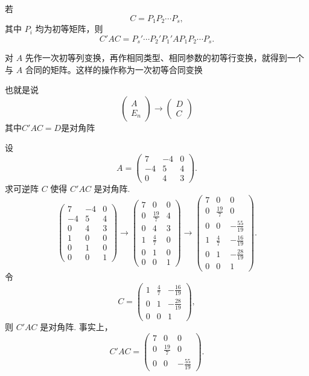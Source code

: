 若
\[
C=P_1P_2\cdots P_s,
\]
其中 $P_i$ 均为初等矩阵，则
\[
C'AC=P_s'\cdots P_2'P_1'AP_1P_2\cdots P_s.
\]
\begin{definition}\label{p1:concept:c7-l795}
	对 $A$ 先作一次初等列变换，再作相同类型、相同参数的初等行变换，就得到一个与 $A$ 合同的矩阵。这样的操作称为一次初等合同变换
\end{definition}
也就是说\[\begin{pmatrix}
	A\\
	E_n
\end{pmatrix}\to \begin{pmatrix}
D\\
C
\end{pmatrix}\]
其中$C'AC=D$是对角阵
\begin{example}
	设
	\[
	A=\begin{pmatrix}
		7&-4&0\\
		-4&5&4\\
		0&4&3
	\end{pmatrix}.
	\]
	求可逆阵 $C$ 使得 $C'AC$ 是对角阵.
	\[
	\left(\begin{array}{ccc}
		7&-4&0\\
		-4&5&4\\
		0&4&3\\ \hline
		1&0&0\\
		0&1&0\\
		0&0&1
	\end{array}\right)
	\longrightarrow
	\left(\begin{array}{ccc}
		7&0&0\\
		0&\frac{19}{7}&4\\
		0&4&3\\ \hline
		1&\frac{4}{7}&0\\
		0&1&0\\
		0&0&1
	\end{array}\right)
	\longrightarrow
	\left(\begin{array}{ccc}
		7&0&0\\
		0&\frac{19}{7}&0\\
		0&0&-\frac{55}{19}\\ \hline
		1&\frac{4}{7}&-\frac{16}{19}\\
		0&1&-\frac{28}{19}\\
		0&0&1
	\end{array}\right).
	\]
	令
	\[
	C=\begin{pmatrix}
		1&\frac{4}{7}&-\frac{16}{19}\\
		0&1&-\frac{28}{19}\\
		0&0&1
	\end{pmatrix},
	\]
	则 $C'AC$ 是对角阵. 事实上，
	\[
	C'AC=\begin{pmatrix}
		7&0&0\\
		0&\frac{19}{7}&0\\
		0&0&-\frac{55}{19}
	\end{pmatrix}.
	\]
\end{example}


